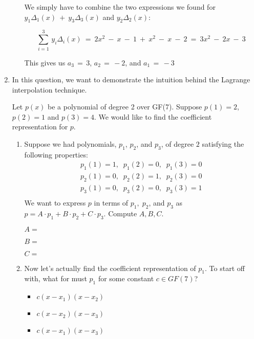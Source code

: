 \documentclass[11pt, preview]{standalone} %
\begin{document}
\begin{enumerate}
\begin{enumerate}
\begin{Freeform}{-3}
\Solution We simply have to combine the two expressions we found for $y_1 \Delta_1(x)\ +\ y_3 \Delta_3(x)$ and $y_2 \Delta_2(x)$:

$$\sum_{i = 1}^{3}\, y_i \Delta_i(x)\ =\ 2x^2\ -\ x\ -\ 1\ +\ x^2\ -\ x\ -\ 2\ =\ 3 x^2\ -\ 2x\ -\ 3$$

This gives us $a_3\, =\, 3$, $a_2\, =\, -2$, and $a_1\, =\, -3$
\end{Freeform}

\end{enumerate}

\item In this question, we want to demonstrate the intuition behind the Lagrange interpolation technique.

Let $p(x)$ be a polynomial of degree 2 over GF(7). Suppose $p(1) = 2$, $p(2) = 1$ and $p(3) = 4$. We would like to find the coefficient representation for $p$.
\begin{enumerate}
\item Suppose we had polynomials, $p_1$, $p_2$, and $p_3$, of degree $2$  satisfying the following properties:
\begin{align*}
    p_1(1) = 1, \;\;p_1(2) = 0,\;\;p_1(3)=0\\
    p_2(1) = 0, \;\;p_2(2) = 1,\;\;p_2(3)=0\\
    p_3(1) = 0, \;\;p_3(2) = 0,\;\;p_3(3)=1\\
\end{align*}
We want to express $p$ in terms of $p_1,\;p_2$, and $p_3$ as $p = A \cdot p_1 + B \cdot p_2 + C \cdot p_3$. Compute $A, B, C$.
\begin{Freeform}{2}
$A=$
\end{Freeform}
\begin{Freeform}{1}
$B=$
\end{Freeform}
\begin{Freeform}{4}
$C=$
\end{Freeform}
\item Now let's actually find the coefficient representation of $p_1$. To start off with, what for must $p_1$ for some constant $c \in GF(7)$?
\begin{Choices}
\begin{itemize}
\FalseChoice \item $c(x-x_1)(x-x_2)$
\TrueChoice \item $c(x-x_2)(x-x_3)$
\FalseChoice \item $c(x-x_1)(x-x_3)$
\end{itemize}
\end{Choices}


\end{enumerate}
\end{enumerate}
\end{document}
